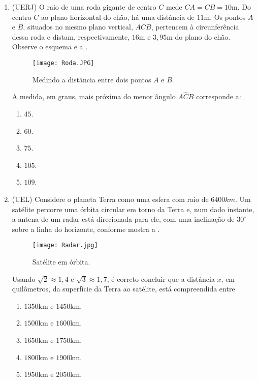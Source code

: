 \begin{enumerate}
\item{}
(UERJ) O raio de uma roda gigante de centro $C$ mede $CA = CB = 10$m. Do centro $C$ ao plano horizontal do chão, há uma distância de $11$m. Os pontos $A$ e $B$, situados no mesmo plano vertical, $ACB$, pertencem à circunferência dessa roda e distam, respectivamente, $16$m e $3,95$m do plano do chão. Observe o esquema e a .
\begin{figure}[H]
    \centering
    \texttt{[image: Roda.JPG]}
    \caption{Medindo a distância entre dois pontos $A$ e $B$.}
    \label{Roda}
\end{figure}
A medida, em graus, mais próxima do menor ângulo $A\hat{C}B$ corresponde a: 
\begin{enumerate}
    \item $45$.
    \item $60$.
    \item $75$.
    \item $105$.
    \item $109$.
\end{enumerate} 

\item{}
(UEL) Considere o planeta Terra como uma esfera com raio de $6400 km$. Um satélite percorre uma órbita circular em torno da Terra e, num dado instante, a antena de um radar está direcionada para ele, com uma inclinação de $30^\circ$ sobre a linha do horizonte, conforme mostra a . 
\begin{figure}[H]
    \centering
    \texttt{[image: Radar.jpg]}
    \caption{Satélite em órbita.}
    \label{Radar}
\end{figure}
Usando  $\sqrt{2} \approx 1,4$ e $\sqrt{3} \approx 1,7$, é correto concluir que a distância $x$, em quilômetros, da superfície da Terra ao satélite, está compreendida entre

\begin{enumerate}
    \item $1350$km e $1450$km.
    \item $1500$km e $1600$km.
    \item $1650$km e $1750$km.
    \item $1800$km e $1900$km.
    \item $1950$km e $2050$km.
\end{enumerate} 


\end{enumerate}
